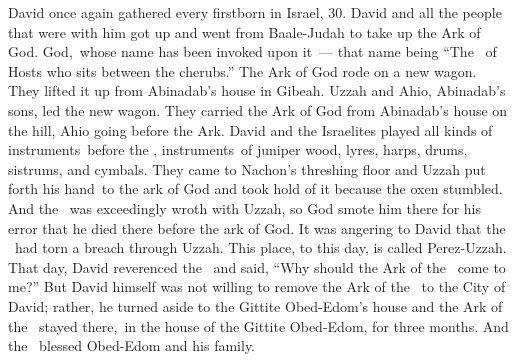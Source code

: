 
\begin{inparaenum}
   David once again gathered every firstborn in Israel, 30.%
   David and all the people that were with him got up and went from Baale-Judah to take up the Ark of God. God,\understood{}\ whose name has been invoked upon it~--- that name being ``The \lord\ of Hosts who sits between the cherubs.''%
   The Ark of God rode on a new wagon. They lifted it up from Abinadab's house in Gibeah. Uzzah and Ahio, Abinadab's sons, led the new wagon.%
   They carried the Ark of God from Abinadab's house on the hill, Ahio going before the Ark.%
   David and the Israelites played all kinds of instruments\understood{}\ before the \lord, instruments\understood{}\ of juniper wood, lyres, harps, drums, sistrums, and cymbals.%
   They came to Nachon's threshing floor and Uzzah put forth his hand\understood{}\ to the ark of God and took hold of it because the oxen stumbled.%
   And the \lord\ was exceedingly wroth with Uzzah, so God smote him there for his error that he died there before the ark of God.%
   It was angering to David that the \lord\ had torn a breach through Uzzah. This place, to this day, is called Perez-Uzzah.%
   That day, David reverenced the \lord\ and said, ``Why should the Ark of the \lord\ come to me?''%
   But David himself was not willing to remove the Ark of the \lord\ to the City of David; rather, he turned aside to the Gittite Obed-Edom's house%
   and the Ark of the \lord\ stayed there,\understood{}\ in the house of the Gittite Obed-Edom, for three months. And the \lord\ blessed Obed-Edom and his family.%

\end{inparaenum}

